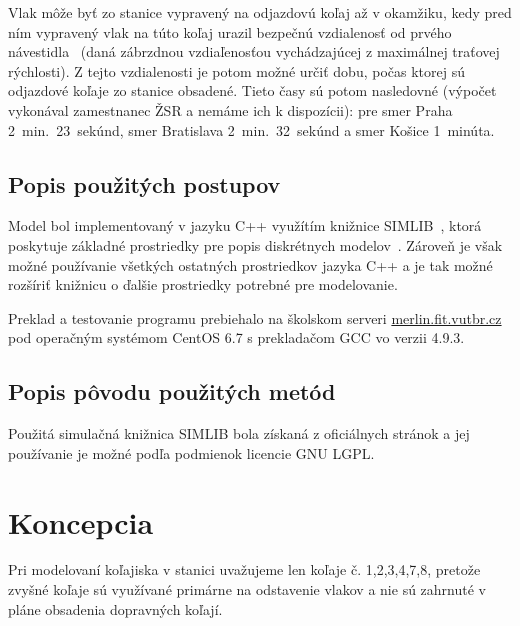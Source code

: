 \documentclass[12pt,a4paper,titlepage,final]{article}
\begin{document}
Vlak môže byť zo stanice vypravený na odjazdovú koľaj až v okamžiku, kedy pred ním vypravený vlak
na túto koľaj urazil bezpečnú vzdialenosť od prvého návestidla~\cite{riadenie}
(daná zábrzdnou vzdiaľenosťou vychádzajúcej z maximálnej traťovej rýchlosti). Z tejto
vzdialenosti je potom možné určiť dobu, počas ktorej sú odjazdové koľaje zo stanice
obsadené. Tieto časy sú potom nasledovné (výpočet vykonával zamestnanec ŽSR a nemáme ich k dispozícii): pre smer Praha 2~min.~23~sekúnd, smer Bratislava 2~min.~32~sekúnd a smer Košice 1~minúta.

\subsection{Popis použitých postupov}

Model bol implementovaný v jazyku C++ využítím knižnice SIMLIB~\cite{simlib}, ktorá
poskytuje základné prostriedky pre popis diskrétnych modelov~\cite[str.\,12]{opora}. Zároveň je však možné používanie všetkých ostatných prostriedkov jazyka C++ a je tak možné rozšíriť knižnicu o ďalšie prostriedky potrebné pre modelovanie.

Preklad a testovanie programu prebiehalo na školskom serveri \url{merlin.fit.vutbr.cz} pod
operačným systémom CentOS 6.7 s prekladačom GCC vo verzii 4.9.3.

\subsection{Popis pôvodu použitých metód}

Použitá simulačná knižnica SIMLIB bola získaná z oficiálnych stránok a jej používanie
je možné podľa podmienok licencie GNU LGPL.

\section{Koncepcia}

Pri modelovaní koľajiska v stanici uvažujeme len koľaje č. 1,2,3,4,7,8, pretože
zvyšné koľaje sú využívané primárne na odstavenie vlakov a nie sú
zahrnuté v pláne obsadenia dopravných koľají.
\end{document}
